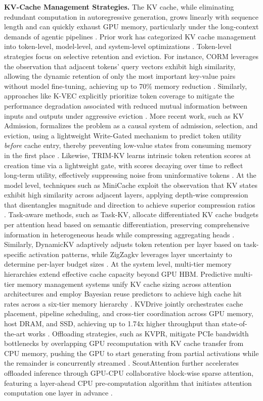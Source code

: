 \documentclass[11pt]{article}
\begin{document}
\textbf{KV-Cache Management Strategies.} The KV cache, while eliminating redundant computation in autoregressive generation, grows linearly with sequence length and can quickly exhaust GPU memory, particularly under the long-context demands of agentic pipelines \cite{ref305,ref304}. Prior work has categorized KV cache management into token-level, model-level, and system-level optimizations \cite{ref303}. Token-level strategies focus on selective retention and eviction. For instance, CORM leverages the observation that adjacent tokens' query vectors exhibit high similarity, allowing the dynamic retention of only the most important key-value pairs without model fine-tuning, achieving up to 70\% memory reduction \cite{ref306}. Similarly, approaches like K-VEC explicitly prioritize token coverage to mitigate the performance degradation associated with reduced mutual information between inputs and outputs under aggressive eviction \cite{ref307}. More recent work, such as KV Admission, formalizes the problem as a causal system of admission, selection, and eviction, using a lightweight Write-Gated mechanism to predict token utility \emph{before} cache entry, thereby preventing low-value states from consuming memory in the first place \cite{ref308}. Likewise, TRIM-KV learns intrinsic token retention scores at creation time via a lightweight gate, with scores decaying over time to reflect long-term utility, effectively suppressing noise from uninformative tokens \cite{ref309}. At the model level, techniques such as MiniCache exploit the observation that KV states exhibit high similarity across adjacent layers, applying depth-wise compression that disentangles magnitude and direction to achieve superior compression ratios \cite{ref310}. Task-aware methods, such as Task-KV, allocate differentiated KV cache budgets per attention head based on semantic differentiation, preserving comprehensive information in heterogeneous heads while compressing aggregating heads \cite{ref311}. Similarly, DynamicKV adaptively adjusts token retention per layer based on task-specific activation patterns, while ZigZagkv leverages layer uncertainty to determine per-layer budget sizes \cite{ref312,ref313}. At the system level, multi-tier memory hierarchies extend effective cache capacity beyond GPU HBM. Predictive multi-tier memory management systems unify KV cache sizing across attention architectures and employ Bayesian reuse predictors to achieve high cache hit rates across a six-tier memory hierarchy \cite{ref314}. KVDrive jointly orchestrates cache placement, pipeline scheduling, and cross-tier coordination across GPU memory, host DRAM, and SSD, achieving up to 1.74x higher throughput than state-of-the-art works \cite{ref315}. Offloading strategies, such as KVPR, mitigate PCIe bandwidth bottlenecks by overlapping GPU recomputation with KV cache transfer from CPU memory, pushing the GPU to start generating from partial activations while the remainder is concurrently streamed \cite{ref316}. ScoutAttention further accelerates offloaded inference through GPU-CPU collaborative block-wise sparse attention, featuring a layer-ahead CPU pre-computation algorithm that initiates attention computation one layer in advance \cite{ref317}.
\end{document}
